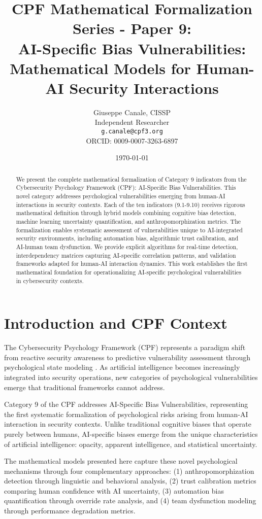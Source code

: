 \documentclass[11pt,a4paper]{article}
\title{CPF Mathematical Formalization Series - Paper 9:\\AI-Specific Bias Vulnerabilities: Mathematical Models for Human-AI Security Interactions}
\author{
    Giuseppe Canale, CISSP\\
    Independent Researcher\\
    \texttt{g.canale@cpf3.org}\\
    ORCID: 0009-0007-3263-6897
}
\date{\today}
\begin{document}
\maketitle

\begin{abstract}
We present the complete mathematical formalization of Category 9 indicators from the Cybersecurity Psychology Framework (CPF): AI-Specific Bias Vulnerabilities. This novel category addresses psychological vulnerabilities emerging from human-AI interactions in security contexts. Each of the ten indicators (9.1-9.10) receives rigorous mathematical definition through hybrid models combining cognitive bias detection, machine learning uncertainty quantification, and anthropomorphization metrics. The formalization enables systematic assessment of vulnerabilities unique to AI-integrated security environments, including automation bias, algorithmic trust calibration, and AI-human team dysfunction. We provide explicit algorithms for real-time detection, interdependency matrices capturing AI-specific correlation patterns, and validation frameworks adapted for human-AI interaction dynamics. This work establishes the first mathematical foundation for operationalizing AI-specific psychological vulnerabilities in cybersecurity contexts.
\end{abstract}

\section{Introduction and CPF Context}

The Cybersecurity Psychology Framework (CPF) represents a paradigm shift from reactive security awareness to predictive vulnerability assessment through psychological state modeling \cite{canale2024cpf}. As artificial intelligence becomes increasingly integrated into security operations, new categories of psychological vulnerabilities emerge that traditional frameworks cannot address.

Category 9 of the CPF addresses AI-Specific Bias Vulnerabilities, representing the first systematic formalization of psychological risks arising from human-AI interaction in security contexts. Unlike traditional cognitive biases that operate purely between humans, AI-specific biases emerge from the unique characteristics of artificial intelligence: opacity, apparent intelligence, and statistical uncertainty.

The mathematical models presented here capture these novel psychological mechanisms through four complementary approaches: (1) anthropomorphization detection through linguistic and behavioral analysis, (2) trust calibration metrics comparing human confidence with AI uncertainty, (3) automation bias quantification through override rate analysis, and (4) team dysfunction modeling through performance degradation metrics.
\end{document}
